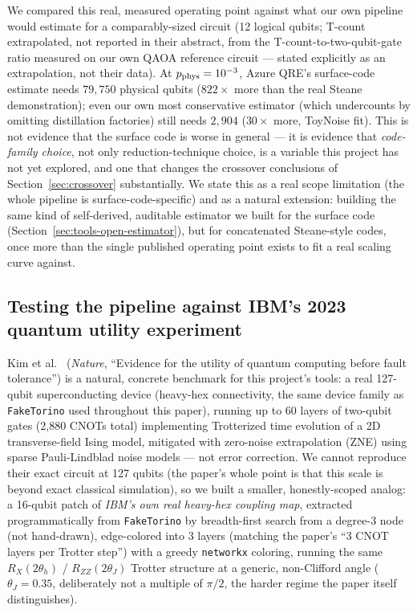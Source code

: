 \documentclass[9pt,twocolumn]{extarticle}
\begin{document}
We compared this real, measured operating point against what our own
pipeline would estimate for a comparably-sized circuit (12 logical qubits;
T-count extrapolated, not reported in their abstract, from the
T-count-to-two-qubit-gate ratio measured on our own QAOA reference circuit
--- stated explicitly as an extrapolation, not their data). At
$p_{\rm phys}=10^{-3}$, Azure QRE's surface-code estimate needs
$79{,}750$ physical qubits ($822\times$ more than the real Steane
demonstration); even our own most conservative estimator (which
undercounts by omitting distillation factories) still needs $2{,}904$
($30\times$ more, ToyNoise fit). This is not evidence that the surface code is worse in
general --- it is evidence that \emph{code-family choice}, not only
reduction-technique choice, is a variable this project has not yet
explored, and one that changes the crossover conclusions of
Section~\ref{sec:crossover} substantially. We state this as a real scope
limitation (the whole pipeline is surface-code-specific) and as a natural
extension: building the same kind of self-derived, auditable estimator we
built for the surface code (Section~\ref{sec:tools-open-estimator}), but
for concatenated Steane-style codes, once more than the single published
operating point exists to fit a real scaling curve against.

\subsection{Testing the pipeline against IBM's 2023 quantum utility experiment}
\label{sec:ibm-utility}
Kim et al.\ \cite{kim2023utility} (\emph{Nature}, ``Evidence for the
utility of quantum computing before fault tolerance'') is a natural,
concrete benchmark for this project's tools: a real 127-qubit
superconducting device (heavy-hex connectivity, the same device family as
\texttt{FakeTorino} used throughout this paper), running up to 60 layers
of two-qubit gates (2{,}880 CNOTs total) implementing Trotterized
time evolution of a 2D transverse-field Ising model, mitigated with
zero-noise extrapolation (ZNE) using sparse Pauli-Lindblad noise models
--- not error correction. We cannot reproduce their exact circuit at
127 qubits (the paper's whole point is that this scale is beyond exact
classical simulation), so we built a smaller, honestly-scoped analog: a
16-qubit patch of \emph{IBM's own real heavy-hex coupling map}, extracted
programmatically from \texttt{FakeTorino} by breadth-first search from a
degree-3 node (not hand-drawn), edge-colored into 3 layers (matching the
paper's ``3 CNOT layers per Trotter step'') with a greedy
\texttt{networkx} coloring, running the same $R_X(2\theta_h)$ /
$R_{ZZ}(2\theta_J)$ Trotter structure at a generic, non-Clifford angle
($\theta_J=0.35$, deliberately not a multiple of $\pi/2$, the harder
regime the paper itself distinguishes).
\end{document}
